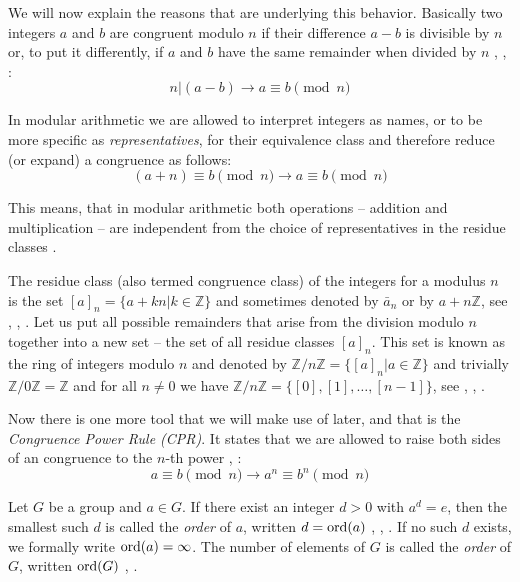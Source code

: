 We will now explain the reasons that are underlying this behavior. Basically two integers $a$ and $b$ are congruent modulo $n$ if their difference $a-b$ is divisible by $n$ or, to put it differently, if $a$ and $b$ have the same remainder when divided by $n$ \cite[p.~15]{Ref_Wolfart_2011}, \cite[p.~44]{Ref_Forster_2015}, \cite[p.~19]{Ref_Mueller-Stach_2011}:
\begin{equation}
\label{eq:congruence}
n|(a-b)\rightarrow a\equiv b\pmod n
\end{equation}

In modular arithmetic we are allowed to interpret integers as names, or to be more specific as \textit{representatives}, for their equivalence class and therefore reduce (or expand) a congruence as follows:
\begin{equation}
\label{eq:congruence_reduction}
(a+n)\equiv b\pmod n\rightarrow a\equiv b\pmod n
\end{equation}

This means, that in modular arithmetic both operations -- addition and multiplication -- are independent from the choice of representatives in the residue classes \cite[p.~16]{Ref_Wolfart_2011}.

The residue class (also termed congruence class) of the integers for a modulus $n$ is the set $[a]_n=\{a+kn|k\in\mathbb{Z}\}$ and sometimes denoted by $\bar a_n$ or by $a+n\mathbb{Z}$, see \cite[p.~15]{Ref_Wolfart_2011}, \cite[p.~120]{Ref_Schubert_2009}, \cite[p.~25]{Ref_Mueller-Stach_2011}. Let us put all possible remainders that arise from the division modulo $n$ together into a new set -- the set of all residue classes $[a]_n$. This set is known as the ring of integers modulo $n$ and denoted by $\mathbb{Z}/n\mathbb{Z}=\{[a]_n|a\in\mathbb{Z}\}$ and trivially $\mathbb{Z}/0\mathbb{Z}=\mathbb{Z}$ and for all $n\ne0$ we have $\mathbb{Z}/n\mathbb{Z}=\{[0],[1],\ldots,[n-1]\}$, see \cite[p.~15]{Ref_Wolfart_2011}, \cite[p.~25]{Ref_Mueller-Stach_2011}, \cite[p.~81]{Ref_Teschl_2013}.

Now there is one more tool that we will make use of later, and that is the \textit{Congruence Power Rule (CPR)}. It states that we are allowed to raise both sides of an congruence to the $n$-th power \cite[p.~19]{Ref_Mueller-Stach_2011}, \cite[p.~117]{Ref_Benjamin_2009}:
\begin{equation}
\label{eq:congruence_power_rule}
a\equiv b\pmod n\rightarrow a^n\equiv b^n\pmod n
\end{equation}

Let $G$ be a group and $a\in G$. If there exist an integer $d>0$ with $a^d=e$, then the smallest such $d$ is called the \textit{order} of $a$, written $d=\operatorname{ord}(a)$ \cite[p.~35]{Ref_Wolfart_2011}, \cite[p.~50]{Ref_Forster_2015}, \cite[p.~240]{Ref_Modler_Kreh_2012}. If no such $d$ exists, we formally write $\operatorname{ord}(a)=\infty$. The number of elements of $G$ is called the \textit{order} of $G$, written $\operatorname{ord}(G)$ \cite[p.~26]{Ref_Wolfart_2011}, \cite[p.~50]{Ref_Forster_2015}.

